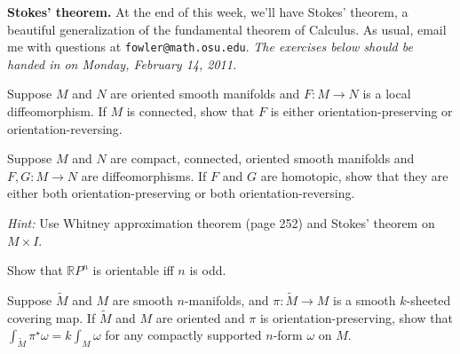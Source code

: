 \documentclass[12pt]{pset}
\author{Jim Fowler}
\date{Winter 2011}
\newcommand{\RP}{\mathbb{R}P}
\begin{document}
\maketitle

\noindent\textbf{Stokes' theorem.}  At the end of this week, we'll
have Stokes' theorem, a beautiful generalization of the fundamental
theorem of Calculus.  As usual, email me with questions at
\texttt{fowler@math.osu.edu}.  \textit{The exercises below should be
  handed in on Monday, February 14, 2011.}

\begin{problem}[Lee 13--3]

  Suppose $M$ and $N$ are oriented smooth manifolds and $F : M \to N$
  is a local diffeomorphism.  If $M$ is connected, show that $F$ is
  either orientation-preserving or orientation-reversing.

\end{problem}
\vfill

\begin{problem}[Lee 14--21]

  Suppose $M$ and $N$ are compact, connected, oriented smooth
  manifolds and $F, G : M \to N$ are diffeomorphisms.  If $F$ and $G$
  are homotopic, show that they are either both orientation-preserving
  or both orientation-reversing.

  \vspace{1ex}\noindent\textit{Hint:} Use Whitney
  approximation theorem (page 252) and Stokes' theorem on $M
  \times I$.

\end{problem}
\vfill

\begin{problem}[Lee 13--6]

  Show that $\RP^n$ is orientable iff $n$ is odd.

\end{problem}
\vfill

\begin{problem}[Lee 14--5a]
  
  Suppose $\tilde{M}$ and $M$ are smooth $n$-manifolds, and $\pi :
  \tilde{M} \to M$ is a smooth $k$-sheeted covering map.  If
  $\tilde{M}$ and $M$ are oriented and $\pi$ is
  orientation-preserving, show that $\int_{\tilde{M}} \pi^\star \omega
  = k \int_M \omega$ for any compactly supported $n$-form $\omega$ on
  $M$.

  
\end{problem}
\vfill
\vfill
\end{document}
